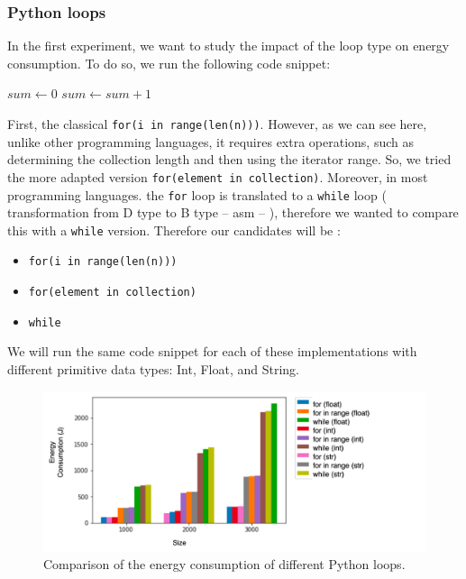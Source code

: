 \subsubsection{Python loops}
In the first experiment, we want to study the impact of the loop type on energy consumption. To do so, we run the following code snippet:
\begin{algorithm}[!htb]
    \begin{algorithmic}[1]
        \State $sum \gets 0$
        \State $sum \gets sum+1$
        \EndFor
        \State {}
    \end{algorithmic}
\end{algorithm}

First, the classical \texttt{for(i in range(len(n)))}.
However, as we can see here, unlike other programming languages, it requires extra operations, such as determining the collection length and then using the iterator range.
So, we tried the more adapted version \texttt{for(element in collection)}.
Moreover, in most programming languages. the \texttt{for} loop is translated to a \texttt{while} loop ( transformation from D type to B type -- asm -- ), therefore we wanted to compare this with a \texttt{while} version.
Therefore our candidates will be :

\begin{itemize}[]
    \item \texttt{for(i in range(len(n)))}
    \item \texttt{for(element in collection)}
    \item \texttt{while}
\end{itemize}

We will run the same code snippet for each of these implementations with different primitive data types: Int, Float, and String.
\begin{figure}[!htb]
    \centering
    \includegraphics[width=\linewidth]{imgs/python_iterations}
    \caption{Comparison of the energy consumption of different Python loops.}
    \label{fig:pythonloops}
\end{figure}

